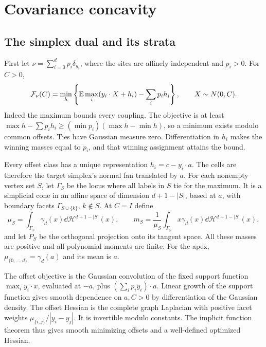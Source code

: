 \section{Covariance concavity}
\subsection{The simplex dual and its strata}
First let $\nu=\sum_{i=0}^d p_i\delta_{y_i}$, where the sites are affinely
independent and $p_i>0$. For $C>0$,
\begin{equation}\label{eq:dual}
 \mathcal F_\nu(C)=\min_h
 \left\{\mathbb E\max_i(y_i\cdot X+h_i)-\sum_i p_i h_i\right\},
 \qquad X\sim N(0,C).
\end{equation}
Indeed the maximum bounds every coupling. The objective is at least
$\max h-\sum p_i h_i\geq(\min p_i)(\max h-\min h)$, so a minimum exists
modulo common offsets. Ties have Gaussian measure zero. Differentiation in
$h_i$ makes the winning masses equal to $p_i$, and that winning assignment
attains the bound.

Every offset class has a unique representation $h_i=c-y_i\cdot a$.
The cells are therefore the target simplex's normal fan translated by $a$.
For each nonempty vertex set $S$, let $\Gamma_S$ be the locus where all
labels in $S$ tie for the maximum. It is a simplicial cone in an affine
space of dimension $d+1-|S|$, based at $a$, with boundary facets
$\Gamma_{S\cup\{k\}}$, $k\notin S$. At $C=I$ define
\[
 \mu_S=\int_{\Gamma_S}\gamma_d(x)\dd\mathcal H^{d+1-|S|}(x),\qquad
 m_S=\frac1{\mu_S}\int_{\Gamma_S}x\gamma_d(x)\dd\mathcal H^{d+1-|S|}(x),
\]
and let $P_S$ be the orthogonal projection onto its tangent space.
All these masses are positive and all polynomial moments are finite.
For the apex, $\mu_{\{0,\ldots,d\}}=\gamma_d(a)$ and its mean is $a$.

The offset objective is the Gaussian convolution of the fixed support
function $\max_i y_i\cdot x$, evaluated at $-a$, plus
$(\sum_i p_i y_i)\cdot a$. Linear growth of the support function gives smooth
dependence on $a,C>0$ by differentiation of the Gaussian density. The offset
Hessian is the complete graph Laplacian with positive facet weights
$\mu_{\{i,j\}}/|y_i-y_j|$. It is invertible modulo constants. The implicit
function theorem thus gives smooth minimizing offsets and a well-defined
optimized Hessian.

